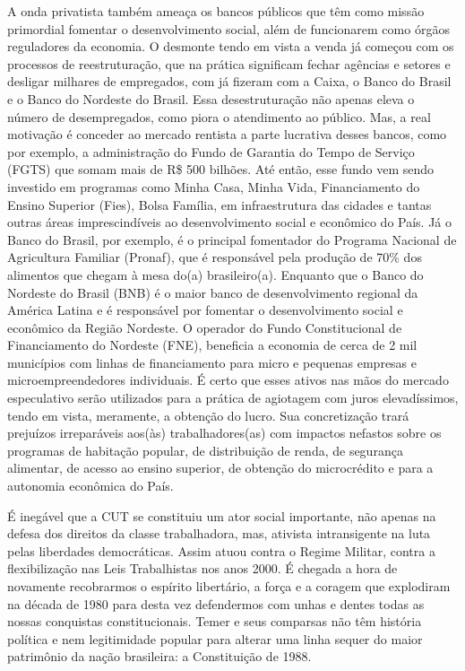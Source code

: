A onda privatista também ameaça os bancos públicos que têm como missão
primordial fomentar o desenvolvimento social, além de funcionarem como
órgãos reguladores da economia. O desmonte tendo em vista a venda já
começou com os processos de reestruturação, que na prática significam
fechar agências e setores e desligar milhares de empregados, com já
fizeram com a Caixa, o Banco do Brasil e o Banco do Nordeste do Brasil.
Essa desestruturação não apenas eleva o número de desempregados, como
piora o atendimento ao público. Mas, a real motivação é conceder ao
mercado rentista a parte lucrativa desses bancos, como por exemplo, a
administração do Fundo de Garantia do Tempo de Serviço (FGTS) que somam
mais de R\$ 500 bilhões. Até então, esse fundo vem sendo investido em
programas como Minha Casa, Minha Vida, Financiamento do Ensino Superior
(Fies), Bolsa Família, em infraestrutura das cidades e tantas outras
áreas imprescindíveis ao desenvolvimento social e econômico do País. Já
o Banco do Brasil, por exemplo, é o principal fomentador do Programa
Nacional de Agricultura Familiar (Pronaf), que é responsável pela
produção de 70\% dos alimentos que chegam à mesa do(a) brasileiro(a).
Enquanto que o Banco do Nordeste do Brasil (BNB) é o maior banco de
desenvolvimento regional da América Latina e é responsável por fomentar
o desenvolvimento social e econômico da Região Nordeste. O operador do
Fundo Constitucional de Financiamento do Nordeste (FNE), beneficia a
economia de cerca de 2 mil municípios com linhas de financiamento para
micro e pequenas empresas e microempreendedores individuais. É certo que
esses ativos nas mãos do mercado especulativo serão utilizados para a
prática de agiotagem com juros elevadíssimos, tendo em vista, meramente,
a obtenção do lucro. Sua concretização trará prejuízos irreparáveis
aos(às) trabalhadores(as) com impactos nefastos sobre os programas de
habitação popular, de distribuição de renda, de segurança alimentar, de
acesso ao ensino superior, de obtenção do microcrédito e para a
autonomia econômica do País.

É inegável que a CUT se constituiu um ator social importante, não apenas
na defesa dos direitos da classe trabalhadora, mas, ativista
intransigente na luta pelas liberdades democráticas. Assim atuou contra
o Regime Militar, contra a flexibilização nas Leis Trabalhistas nos anos
2000. É chegada a hora de novamente recobrarmos o espírito libertário, a
força e a coragem que explodiram na década de 1980 para desta vez
defendermos com unhas e dentes todas as nossas conquistas
constitucionais. Temer e seus comparsas não têm história política e nem
legitimidade popular para alterar uma linha sequer do maior patrimônio
da nação brasileira: a Constituição de 1988.

